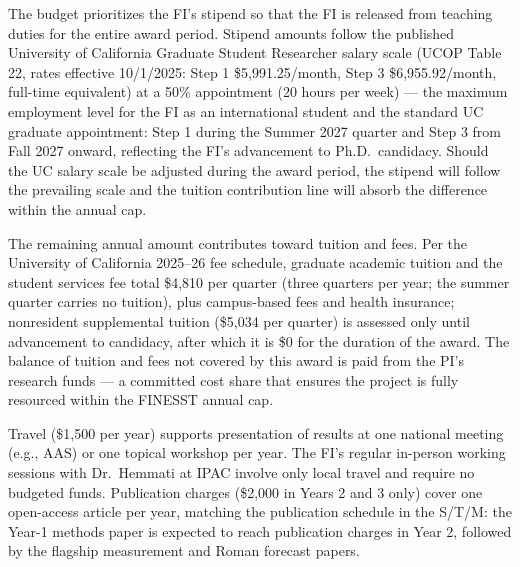 \documentclass[12pt,letterpaper]{article}
\begin{document}
The budget prioritizes the FI's stipend so that the FI is released from
teaching duties for the entire award period. Stipend amounts follow the
published University of California Graduate Student Researcher salary
scale (UCOP Table 22, rates effective 10/1/2025: Step 1
\$5,991.25/month, Step 3 \$6,955.92/month, full-time equivalent) at a
50\% appointment (20 hours per week) --- the maximum employment level
for the FI as an international student and the standard UC graduate
appointment: Step 1 during the Summer 2027 quarter and Step 3 from Fall
2027 onward, reflecting the FI's advancement to Ph.D.\ candidacy. Should the UC salary scale be adjusted
during the award period, the stipend will follow the prevailing scale
and the tuition contribution line will absorb the difference within the
annual cap.

The remaining annual amount contributes toward tuition and fees. Per the
University of California 2025--26 fee schedule, graduate academic
tuition and the student services fee total \$4,810 per quarter (three
quarters per year; the summer quarter carries no tuition), plus
campus-based fees and health insurance; nonresident supplemental tuition
(\$5,034 per quarter) is assessed only until advancement to candidacy,
after which it is \$0 for the duration of the award. The balance of
tuition and fees not covered by this award is paid from the PI's
research funds --- a committed cost share that ensures the project is
fully resourced within the FINESST annual cap.

Travel (\$1,500 per year) supports presentation of results at one
national meeting (e.g., AAS) or one topical workshop per year. The FI's
regular in-person working sessions with Dr.\ Hemmati at IPAC involve
only local travel and require no budgeted funds. Publication charges
(\$2,000 in Years 2 and 3 only) cover one open-access article per year,
matching the publication schedule in the S/T/M: the Year-1 methods paper
is expected to reach publication charges in Year 2, followed by the
flagship measurement and Roman forecast papers.

\end{document}
